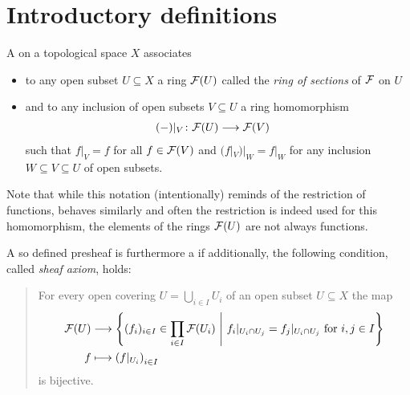 \documentclass[a4paper,parskip=half,numbers=enddot, DIV=12]{scrreprt}
\begin{document}
\section{Introductory definitions}
\begin{defi}
    A  on a topological space $X$ associates 
    \begin{itemize}
    	\item to any open subset $U\subseteq X$ a ring $\mathcal{F}(U)$ called the \emph{ring of sections} of $\mathcal{F}$ on $U$
    	\item and to any inclusion of open subsets $V\subseteq U$ a ring homomorphism 
    	\begin{align*}
	    	(-)|_V\colon \mathcal{F}(U) &\longrightarrow \mathcal{F}(V)
    	\end{align*}
    	such that $f|_V = f$ for all $f\in\mathcal{F}(V)$ and $(f|_V)|_W = f|_W$ for any inclusion $W\subseteq V\subseteq U$ of open subsets.
    \end{itemize}  Note that while this notation (intentionally) reminds of the restriction of functions, behaves similarly and often the restriction is indeed used for this homomorphism, the elements of the rings $\mathcal{F}(U)$ are not always functions. 
    
    A so defined presheaf is furthermore a  if additionally, the following condition, called \emph{sheaf axiom}, holds:
    \begin{quote}
     For every open covering $U = \bigcup_{i\in I} U_i$ of an open subset $U\subseteq X$ the map
        \begin{align*}
			\mathcal{F}(U) &\longrightarrow \left\{(f_i)_{i\in I}\in \prod_{i\in I} \mathcal{F} (U_i)\ \middle|\  f_i|_{U_i\cap U_j} = f_j|_{U_i\cap U_j} \text{ for }i,j\in I\right\}\\
			f &\longmapsto \left(f|_{U_i}\right)_{i\in I}
        \end{align*}
        is bijective. 
    \end{quote}
\end{defi}
\end{document}
